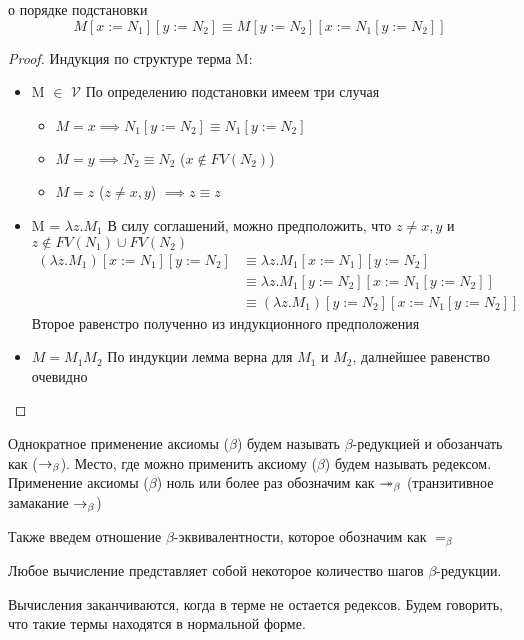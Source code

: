 \documentclass[lambda.tex]{subfiles}
\begin{document}
\begin{lemma}{о порядке подстановки}
	\[M[x := N_1][y := N_2] \equiv M[y := N_2][x := N_1[y := N_2]]\]
\end{lemma}
\begin{proof}
	Индукция по структуре терма M: \\
	\begin{itemize}
		\item M $\in$ $\mathcal{V}$ По определению подстановки имеем три случая
		\begin{itemize}
		 	\item $M = x \implies N_1[y := N_2] \equiv N_1[y := N_2]$
		 	\item $M = y \implies N_2 \equiv N_2$ ($x\not\in FV(N_2)$)
		 	\item $M = z$ ($z \neq x, y$) $\implies z \equiv z$
		 \end{itemize}
		 \item M = $\lambda z.M_1$
		 В силу соглашений, можно предположить, что $z \neq x,y$ и $z\not\in FV(N_1) \cup FV(N_2)$
		 \begin{align*}
		 	(\lambda z.M_1)[x := N_1][y := N_2] &\equiv \lambda z.M_1[x := N_1][y := N_2]\\
		 										&\equiv \lambda z.M_1[y := N_2][x := N_1[y := N_2]] \\
		 										&\equiv (\lambda z.M_1)[y := N_2][x := N_1[y := N_2]]
		 \end{align*}
		 Второе равенстро полученно из индукционного предположения
		 \item $M = M_1 M_2$
		 По индукции лемма верна для $M_1$ и $M_2$, далнейшее равенство очевидно
	\end{itemize}
\end{proof}

Однократное применение аксиомы ($\beta$) будем называть $\beta$-редукцией и обозанчать как ($\rightarrow_\beta$). Место, где можно применить аксиому ($\beta$) будем называть редексом. 
Применение аксиомы ($\beta$) ноль или более раз обозначим как $\twoheadrightarrow_\beta$ (транзитивное замакание $\rightarrow_\beta$)

Также введем отношение $\beta$-эквивалентности, которое обозначим как $=_\beta$

Любое вычисление представляет собой некоторое количество шагов $\beta$-редукции.

Вычисления заканчиваются, когда в терме не остается редексов. Будем говорить, что такие термы находятся в нормальной форме.
\end{document}
